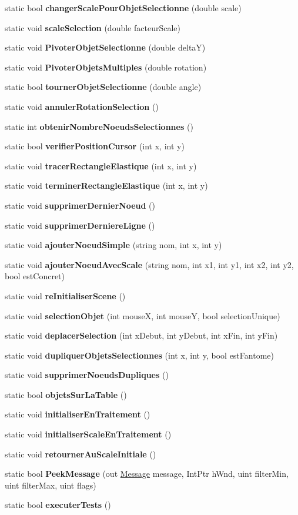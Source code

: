 \begin{DoxyCompactItemize}
\item 
static bool {\bfseries changer\+Scale\+Pour\+Objet\+Selectionne} (double scale)
\item 
static void {\bfseries scale\+Selection} (double facteur\+Scale)
\item 
static void {\bfseries Pivoter\+Objet\+Selectionne} (double deltaY)
\item 
static void {\bfseries Pivoter\+Objets\+Multiples} (double rotation)
\item 
static bool {\bfseries tourner\+Objet\+Selectionne} (double angle)
\item 
static void {\bfseries annuler\+Rotation\+Selection} ()
\item 
static int {\bfseries obtenir\+Nombre\+Noeuds\+Selectionnes} ()
\item 
static bool {\bfseries verifier\+Position\+Cursor} (int x, int y)
\item 
static void {\bfseries tracer\+Rectangle\+Elastique} (int x, int y)
\item 
static void {\bfseries terminer\+Rectangle\+Elastique} (int x, int y)
\item 
static void {\bfseries supprimer\+Dernier\+Noeud} ()
\item 
static void {\bfseries supprimer\+Derniere\+Ligne} ()
\item 
static void {\bfseries ajouter\+Noeud\+Simple} (string nom, int x, int y)
\item 
static void {\bfseries ajouter\+Noeud\+Avec\+Scale} (string nom, int x1, int y1, int x2, int y2, bool est\+Concret)
\item 
static void {\bfseries re\+Initialiser\+Scene} ()
\item 
static void {\bfseries selection\+Objet} (int mouseX, int mouseY, bool selection\+Unique)
\item 
static void {\bfseries deplacer\+Selection} (int x\+Debut, int y\+Debut, int x\+Fin, int y\+Fin)
\item 
static void {\bfseries dupliquer\+Objets\+Selectionnes} (int x, int y, bool est\+Fantome)
\item 
static void {\bfseries supprimer\+Noeuds\+Dupliques} ()
\item 
static bool {\bfseries objets\+Sur\+La\+Table} ()
\item 
static void {\bfseries initialiser\+En\+Traitement} ()
\item 
static void {\bfseries initialiser\+Scale\+En\+Traitement} ()
\item 
static void {\bfseries retourner\+Au\+Scale\+Initiale} ()
\item 
static bool {\bfseries Peek\+Message} (out \hyperlink{struct_interface_graphique_1_1_fonctions_natives_1_1_message}{Message} message, Int\+Ptr h\+Wnd, uint filter\+Min, uint filter\+Max, uint flags)
\item 
static bool {\bfseries executer\+Tests} ()
\end{DoxyCompactItemize}


